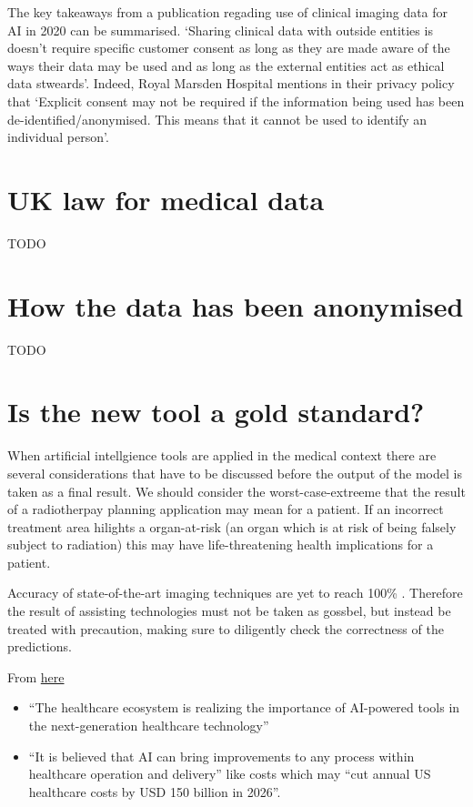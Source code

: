 \documentclass[11pt]{article}
\begin{document}
The key takeaways from a publication regading use of clinical imaging data for AI in 2020 \cite{ethics-imaging-AI} can be summarised. `Sharing clinical data with outside entities is doesn't require specific customer consent as long as they are made aware of the ways their data may be used and as long as the external entities act as ethical data stweards'. Indeed, Royal Marsden Hospital mentions in their privacy policy that `Explicit consent may not be required if the information being used has been de-identified/anonymised. This means that it cannot be used to identify an individual person'\cite{royal-marsden-privacy-note}.

\section{UK law for medical data}

TODO

\section{How the data has been anonymised}

TODO

\section{Is the new tool a gold standard?}

When artificial intellgience tools are applied in the medical context there are several considerations that have to be discussed before the output of the model is taken as a final result. We should consider the worst-case-extreeme that the result of a radiotherpay planning application may mean for a patient. If an incorrect treatment area hilights a organ-at-risk (an organ which is at risk of being falsely subject to radiation) this may have life-threatening health implications for a patient. 

Accuracy of state-of-the-art imaging techniques are yet to reach 100\% \cite{}. Therefore the result of assisting technologies must not be taken as gossbel, but instead be treated with precaution, making sure to diligently check the correctness of the predictions.

\vspace{1em}

From \href{https://www.ncbi.nlm.nih.gov/pmc/articles/PMC7325854/pdf/main.pdf}{here} \cite{rise-of-ai-in-healthcare}

\begin{itemize}
    \item ``The healthcare ecosystem is realizing the importance of AI-powered tools in the next-generation healthcare technology''
    \item ``It is believed that AI can bring improvements to any process within healthcare operation and delivery'' like costs which may ``cut annual US healthcare costs by USD 150 billion in 2026''.
\end{itemize}
\end{document}
